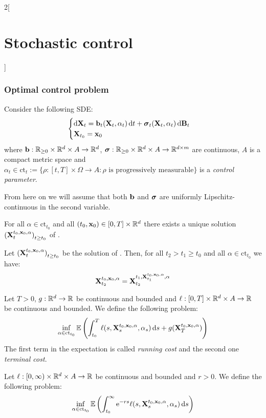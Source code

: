 \documentclass[../../../main_math.tex]{subfiles}
\begin{document}
\begin{multicols}{2}[\section{Stochastic control}]
  \subsubsection{Optimal control problem}
  \begin{definition}
    Consider the following SDE:
    \begin{equation}\label{SCO:SDE_control}
      \begin{cases}
        \dd{\boldsymbol{\mathrm{X}}_t}=\boldsymbol{\mathrm{b}}_t(\boldsymbol{\mathrm{X}}_t,\alpha_t)\dd{t}+\boldsymbol{\mathrm{\sigma}}_t(\boldsymbol{\mathrm{X}}_t,\alpha_t)\dd{\boldsymbol{\mathrm{B}}_t} \\
        \boldsymbol{\mathrm{X}}_{t_0}=\boldsymbol{\mathrm{x}}_0
      \end{cases}
    \end{equation}
    where $\boldsymbol{\mathrm{b}}:\mathbb{R}_{\geq 0}\times\mathbb{R}^d\times A\to\mathbb{R}^d$, $\boldsymbol{\mathrm{\sigma}}:\mathbb{R}_{\geq 0}\times\mathbb{R}^d\times A\to\mathbb{R}^{d\times m}$ are continuous, $A$ is a compact metric space and $\alpha_t\in \text{ct}_t:=\{\rho:[t,T]\times\Omega\to A:\rho\text{ is progressively measurable}\}$ is a \emph{control parameter}.
  \end{definition}
  From here on we will assume that both $\boldsymbol{\mathrm{b}}$ and $\boldsymbol{\mathrm{\sigma}}$ are uniformly Lipschitz-continuous in the second variable.
  \begin{theorem}
    For all $\alpha\in \text{ct}_{t_0}$ and all $(t_0,\boldsymbol{\mathrm{x}}_0)\in [0,T]\times\mathbb{R}^d$ there exists a unique solution ${(\boldsymbol{\mathrm{X}}_t^{t_0,\boldsymbol{\mathrm{x}}_0,\alpha})}_{t\geq t_0}$ of .
  \end{theorem}
  \begin{lemma}
    Let ${(\boldsymbol{\mathrm{X}}_t^{t_0,\boldsymbol{\mathrm{x}}_0,\alpha})}_{t\geq t_0}$ be the solution of . Then, for all $t_2>t_1\geq t_0$ and all $\alpha\in \text{ct}_{t_0}$ we have:
    $$
      \boldsymbol{\mathrm{X}}_{t_2}^{t_0,\boldsymbol{\mathrm{x}}_0,\alpha}=\boldsymbol{\mathrm{X}}_{t_2}^{t_1,\boldsymbol{\mathrm{X}}_{t_1}^{t_0,\boldsymbol{\mathrm{x}}_0,\alpha},\alpha}
    $$
  \end{lemma}
  \begin{definition}
    Let $T>0$, $g:\mathbb{R}^d\to\mathbb{R}$ be continuous and bounded and $\ell:[0,T]\times\mathbb{R}^d\times A\to\mathbb{R}$ be continuous and bounded. We define the following problem:
    $$
      \inf_{\alpha\in \text{ct}_{t_0}}\mathbb{E}\left(\int_{t_0}^T \ell(s,\boldsymbol{\mathrm{X}}_s^{t_0,\boldsymbol{\mathrm{x}}_0,\alpha},\alpha_s)\dd{s}+g(\boldsymbol{\mathrm{X}}_T^{t_0,\boldsymbol{\mathrm{x}}_0,\alpha})\right)
    $$
    The first term in the expectation is called \emph{running cost} and the second one \emph{terminal cost}.
  \end{definition}
  \begin{definition}
    Let $\ell:[0,\infty)\times\mathbb{R}^d\times A\to\mathbb{R}$ be continuous and bounded and $r>0$. We define the following problem:
    $$
      \inf_{\alpha\in \text{ct}_{t_0}}\mathbb{E}\left(\int_{t_0}^\infty \mathrm{e}^{-r s}\ell(s,\boldsymbol{\mathrm{X}}_s^{t_0,\boldsymbol{\mathrm{x}}_0,\alpha},\alpha_s)\dd{s}\right)
    $$
  \end{definition}
\end{multicols}
\end{document}
